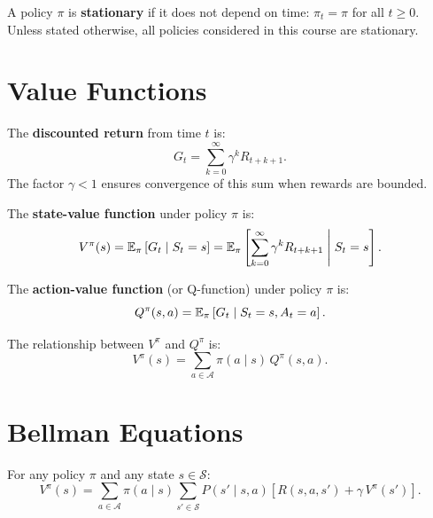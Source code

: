 \begin{definition}
A policy $\pi$ is \textbf{stationary} if it does not depend on time:
$\pi_t = \pi$ for all $t \geq 0$. Unless stated otherwise, all policies
considered in this course are stationary.
\end{definition}

\section{Value Functions}

\begin{definition}
The \textbf{discounted return} from time $t$ is:
\[
    G_t = \sum_{k=0}^{\infty} \gamma^k R_{t+k+1}.
\]
The factor $\gamma < 1$ ensures convergence of this sum when rewards are bounded.
\end{definition}

\begin{definition}
The \textbf{state-value function} under policy $\pi$ is:
\[
    V^\pi(s) = \mathbb{E}_\pi \left[ G_t \mid S_t = s \right]
    = \mathbb{E}_\pi \left[ \sum_{k=0}^{\infty} \gamma^k R_{t+k+1} \;\middle|\; S_t = s \right].
\]
\end{definition}

\begin{definition}
The \textbf{action-value function} (or Q-function) under policy $\pi$ is:
\[
    Q^\pi(s, a) = \mathbb{E}_\pi \left[ G_t \mid S_t = s, A_t = a \right].
\]
\end{definition}

\begin{remark}
The relationship between $V^\pi$ and $Q^\pi$ is:
\[
    V^\pi(s) = \sum_{a \in \mathcal{A}} \pi(a \mid s) \, Q^\pi(s, a).
\]
\end{remark}

\section{Bellman Equations}

\begin{theorem}
For any policy $\pi$ and any state $s \in \mathcal{S}$:
\[
    V^\pi(s) = \sum_{a \in \mathcal{A}} \pi(a \mid s) \sum_{s' \in \mathcal{S}}
    P(s' \mid s, a) \left[ R(s, a, s') + \gamma \, V^\pi(s') \right].
\]
\end{theorem}

